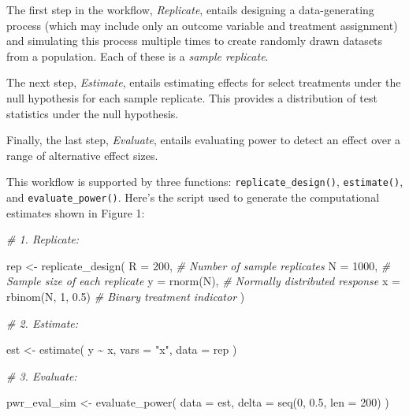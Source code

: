 \documentclass[
  12pt,
]{book}
\newenvironment{Shaded}{\begin{snugshade}}{\end{snugshade}}
\newcommand{\AttributeTok}[1]{\textcolor[rgb]{0.77,0.63,0.00}{#1}}
\newcommand{\CommentTok}[1]{\textcolor[rgb]{0.56,0.35,0.01}{\textit{#1}}}
\newcommand{\DecValTok}[1]{\textcolor[rgb]{0.00,0.00,0.81}{#1}}
\newcommand{\FloatTok}[1]{\textcolor[rgb]{0.00,0.00,0.81}{#1}}
\newcommand{\FunctionTok}[1]{\textcolor[rgb]{0.00,0.00,0.00}{#1}}
\newcommand{\NormalTok}[1]{#1}
\newcommand{\OtherTok}[1]{\textcolor[rgb]{0.56,0.35,0.01}{#1}}
\newcommand{\SpecialCharTok}[1]{\textcolor[rgb]{0.00,0.00,0.00}{#1}}
\newcommand{\StringTok}[1]{\textcolor[rgb]{0.31,0.60,0.02}{#1}}
\theoremstyle{definition}
\theoremstyle{definition}
\theoremstyle{definition}
\theoremstyle{remark}
\begin{document}
The first step in the workflow, \emph{Replicate}, entails designing a
data-generating process (which may include only an outcome variable and
treatment assignment) and simulating this process multiple times to
create randomly drawn datasets from a population. Each of these is a
\emph{sample replicate}.

The next step, \emph{Estimate}, entails estimating effects for select
treatments under the null hypothesis for each sample replicate. This
provides a distribution of test statistics under the null hypothesis.

Finally, the last step, \emph{Evaluate}, entails evaluating power to
detect an effect over a range of alternative effect sizes.

This workflow is supported by three functions:
\texttt{replicate\_design()}, \texttt{estimate()}, and
\texttt{evaluate\_power()}. Here's the script used to generate the
computational estimates shown in Figure 1:

\begin{Shaded}
\begin{Highlighting}[]
\CommentTok{\# 1. Replicate:}

\NormalTok{rep }\OtherTok{\textless{}{-}} \FunctionTok{replicate\_design}\NormalTok{(}
  \AttributeTok{R =} \DecValTok{200}\NormalTok{, }\CommentTok{\# Number of sample replicates}
  \AttributeTok{N =} \DecValTok{1000}\NormalTok{, }\CommentTok{\# Sample size of each replicate}
  \AttributeTok{y =} \FunctionTok{rnorm}\NormalTok{(N), }\CommentTok{\# Normally distributed response}
  \AttributeTok{x =} \FunctionTok{rbinom}\NormalTok{(N, }\DecValTok{1}\NormalTok{, }\FloatTok{0.5}\NormalTok{) }\CommentTok{\# Binary treatment indicator}
\NormalTok{)}

\CommentTok{\# 2. Estimate:}

\NormalTok{est }\OtherTok{\textless{}{-}} \FunctionTok{estimate}\NormalTok{(}
\NormalTok{  y }\SpecialCharTok{\textasciitilde{}}\NormalTok{ x,}
  \AttributeTok{vars =} \StringTok{"x"}\NormalTok{, }\AttributeTok{data =}\NormalTok{ rep}
\NormalTok{)}

\CommentTok{\# 3. Evaluate:}

\NormalTok{pwr\_eval\_sim }\OtherTok{\textless{}{-}} \FunctionTok{evaluate\_power}\NormalTok{(}
  \AttributeTok{data =}\NormalTok{ est,}
  \AttributeTok{delta =} \FunctionTok{seq}\NormalTok{(}\DecValTok{0}\NormalTok{, }\FloatTok{0.5}\NormalTok{, }\AttributeTok{len =} \DecValTok{200}\NormalTok{)}
\NormalTok{)}
\end{Highlighting}
\end{Shaded}
\end{document}
